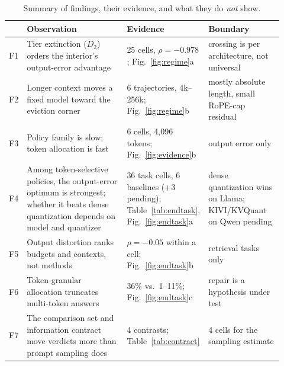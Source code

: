 \documentclass{article}
\theoremstyle{definition}
\begin{document}
\begin{table}[t]
\centering
\small
\setlength{\tabcolsep}{4pt}
\caption{Summary of findings, their evidence, and what they do \emph{not} show.}
\label{tab:findings}
\begin{tabular}{@{}p{0.03\linewidth}p{0.40\linewidth}p{0.20\linewidth}p{0.29\linewidth}@{}}
\toprule
& \textbf{Observation} & \textbf{Evidence} & \textbf{Boundary} \\
\midrule
F1 & Tier extinction ($D_2$) orders the interior's output-error advantage & 25 cells, $\rho=-0.978$; Fig.~\ref{fig:regime}a & crossing is per architecture, not universal \\
F2 & Longer context moves a fixed model toward the eviction corner & 6 trajectories, 4k--256k; Fig.~\ref{fig:regime}b & mostly absolute length, small RoPE-cap residual \\
F3 & Policy family is slow; token allocation is fast & 6 cells, 4,096 tokens; Fig.~\ref{fig:evidence}b & output error only \\
F4 & Among token-selective policies, the output-error optimum is strongest; whether it beats dense quantization depends on model and quantizer & 36 task cells, 6 baselines (+3 pending); Table~\ref{tab:endtask}, Fig.~\ref{fig:endtask}a & dense quantization wins on Llama; KIVI/KVQuant on Qwen pending \\
F5 & Output distortion ranks budgets and contexts, not methods & $\rho=-0.05$ within a cell; Fig.~\ref{fig:endtask}b & retrieval tasks only \\
F6 & Token-granular allocation truncates multi-token answers & 36\% vs.\ 1--11\%; Fig.~\ref{fig:endtask}c & repair is a hypothesis under test \\
F7 & The comparison set and information contract move verdicts more than prompt sampling does & 4 contrasts; Table~\ref{tab:contract} & 4 cells for the sampling estimate \\
\bottomrule
\end{tabular}
\vspace{-2mm}
\end{table}
\end{document}
